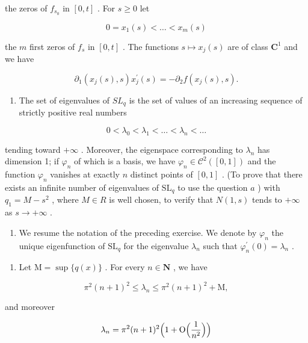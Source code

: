 the zeros of \(f_{s_0}\) in \([0,t]\) . For \(s \geqslant 0\) let

\[
0 = x _ {1} (s) <   \dots <   x _ {m} (s)
\]

the \(m\) first zeros of \(f_{s}\) in \([0,t]\) . The functions \(s\mapsto x_{j}(s)\) are of class \(\mathbf{C}^1\) and we have

\[
\partial_ {1} (x _ {j} (s), s) x _ {j} ^ {\prime} (s) = - \partial_ {2} f (x _ {j} (s), s).
\]

\begin{enumerate}
\def\labelenumi{\alph{enumi})}
\setcounter{enumi}{7}
\tightlist
\item
  The set of eigenvalues of \(SL_{q}\) is the set of values of an increasing sequence of strictly positive real numbers
\end{enumerate}

\[
0 <   \lambda_ {0} <   \lambda_ {1} <   \dots <   \lambda_ {n} <   \dots
\]

tending toward \(+\infty\) . Moreover, the eigenspace corresponding to \(\lambda_{n}\) has dimension 1; if \(\varphi_{n}\) of which is a basis, we have \(\varphi_{n} \in \mathcal{C}^{2}([0,1])\) and the function \(\varphi_{n}\) vanishes at exactly \(n\) distinct points of \([0,1]\) . (To prove that there exists an infinite number of eigenvalues of \(\mathrm{SL}_{q}\) to use the question \(a\) ) with \(q_{1} = M - s^{2}\) , where \(M \in R\) is well chosen, to verify that \(N(1, s)\) tends to \(+\infty\) as \(s \to +\infty\) .

\begin{enumerate}
\def\labelenumi{\arabic{enumi})}
\setcounter{enumi}{20}
\tightlist
\item
  We resume the notation of the preceding exercise. We denote by \(\varphi_{n}\) the unique eigenfunction of \(\mathrm{SL}_{q}\) for the eigenvalue \(\lambda_{n}\) such that \(\varphi_{n}^{\prime}(0)=\lambda_{n}\) .
\end{enumerate}

\begin{enumerate}
\def\labelenumi{\alph{enumi})}
\tightlist
\item
  Let \(\mathrm{M} = \sup \{q(x)\}\) . For every \(n \in \mathbf{N}\) , we have
\end{enumerate}

\[
\pi^ {2} (n + 1) ^ {2} \leqslant \lambda_ {n} \leqslant \pi^ {2} (n + 1) ^ {2} + \mathrm{M},
\]

and moreover

\[
\lambda_ {n} = \pi^ {2} (n + 1) ^ {2} \Bigl (1 + \mathrm{O} \Bigl (\frac {1}{n ^ {2}} \Bigr) \Bigr)
\]

